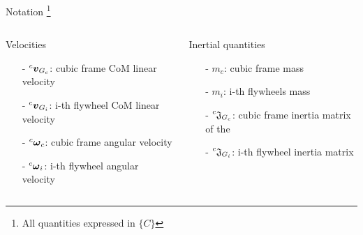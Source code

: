 \begin{frame}{Notation \footnote[frame]{All quantities expressed in $\{C\}$}}
  \begin{columns}[t]
    \begin{column}{0.5\textwidth}
      \begin{block}{Velocities}
        \begin{itemize}
        \item[-] $\prescript{c}{}{\vec{v}}_{G_{c}}$: cubic frame CoM linear velocity
        \item[-] $\prescript{c}{}{\vec{v}}_{G_{i}}$: i-th flywheel CoM linear velocity
        \item[-] $\prescript{c}{}{\vec{\omega}}_{c}$: cubic frame angular velocity
        \item[-] $\prescript{c}{}{\vec{\omega}}_{i}$: i-th flywheel angular velocity
        \end{itemize}
      \end{block}
    \end{column}
    \begin{column}{0.5\textwidth}
      \begin{block}{Inertial quantities}
        \begin{itemize}
        \item[-] $m_c$: cubic frame mass
        \item[-] $m_i$: i-th flywheels mass
        \item[-] $\prescript{c}{}{\mathfrak{J}}_{G_{c}}$: cubic frame inertia matrix of the 
        \item[-] $\prescript{c}{}{\mathfrak{J}}_{G_{i}}$: i-th flywheel inertia matrix
        \end{itemize}
      \end{block}
    \end{column}
  \end{columns}
\end{frame}


